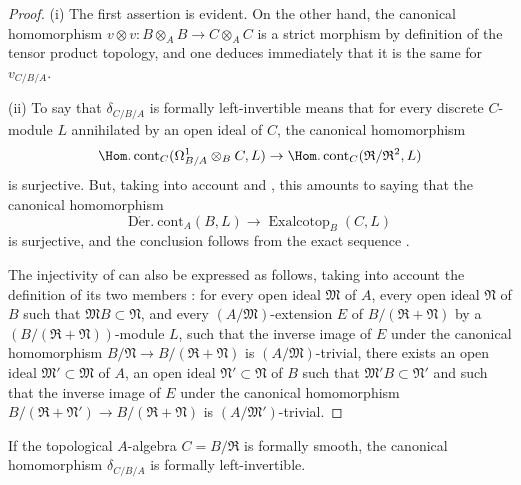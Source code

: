 \begin{proof}
(i) The first assertion is evident.
On the other hand, the canonical homomorphism $v\otimes v:B\otimes_A B\to C\otimes_A C$ is a strict morphism by definition of the tensor product topology, and one deduces immediately that it is the same for $v_{C/B/A}$.

(ii) To say that $\delta_{C/B/A}$ is formally left-invertible means that for every discrete $C$-module $L$ annihilated by an open ideal of $C$, the canonical homomorphism
\[
  \Hom.\operatorname{cont}_C(\Omega^1_{B/A}\otimes_B C,L)\to\Hom.\operatorname{cont}_C(\mathfrak{R}/\mathfrak{R}^2,L)
\]
is surjective.
But, taking into account  and , this amounts to saying that the canonical homomorphism
\[
  \operatorname{D\acute{e}r.\ cont}_A(B,L)\to\operatorname{Exalcotop}_B(C,L)
\]
is surjective, and the conclusion follows from the exact sequence .

The injectivity of  can also be expressed as follows, taking into account the definition of its two members : for every open ideal $\mathfrak{M}$ of $A$, every open ideal $\mathfrak{N}$ of $B$ such that $\mathfrak{M}B\subset\mathfrak{N}$, and every $(A/\mathfrak{M})$-extension $E$ of $B/(\mathfrak{R}+\mathfrak{N})$ by a $(B/(\mathfrak{R}+\mathfrak{N}))$-module $L$, such that the inverse image of $E$ under the canonical homomorphism $B/\mathfrak{N}\to B/(\mathfrak{R}+\mathfrak{N})$ is $(A/\mathfrak{M})$-trivial, there exists an open ideal $\mathfrak{M}'\subset\mathfrak{M}$ of $A$,
an open ideal $\mathfrak{N}'\subset\mathfrak{N}$ of $B$ such that $\mathfrak{M}'B\subset\mathfrak{N}'$ and such that the inverse image of $E$ under the canonical homomorphism $B/(\mathfrak{R}+\mathfrak{N}')\to B/(\mathfrak{R}+\mathfrak{N})$ is $(A/\mathfrak{M}')$-trivial.
\end{proof}

\begin{corollary}[20.7.9]
\label{0.20.7.9}
If the topological $A$-algebra $C=B/\mathfrak{R}$ is formally smooth, the canonical homomorphism $\delta_{C/B/A}$ is formally left-invertible.
\end{corollary}

